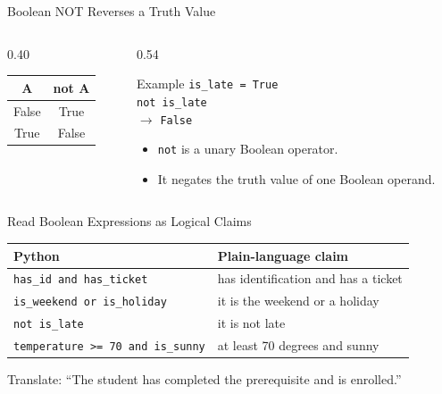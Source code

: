 \documentclass[aspectratio=169,10pt]{beamer}
\begin{document}
\begin{frame}{Boolean NOT Reverses a Truth Value}
  \begin{columns}[T,onlytextwidth]
    \begin{column}{0.40\textwidth}
      \begin{center}
        \renewcommand{\arraystretch}{1.35}
        \begin{tabular}{c|c}
          \textbf{A} & \textbf{not A} \\\hline
          False & True \\
          True & False
        \end{tabular}
      \end{center}
    \end{column}

    \begin{column}{0.54\textwidth}
      \begin{block}{Example}
        \texttt{is\_late = True}\\[0.08in]
        \texttt{not is\_late}\\[0.08in]
        $\longrightarrow$ \texttt{False}
      \end{block}

      \begin{itemize}
        \item \texttt{not} is a unary Boolean operator.
        \item It negates the truth value of one Boolean operand.
      \end{itemize}
    \end{column}
  \end{columns}
\end{frame}

\begin{frame}{Read Boolean Expressions as Logical Claims}
  \begin{center}
    \renewcommand{\arraystretch}{1.35}
    \begin{tabular}{l|l}
      \textbf{Python} & \textbf{Plain-language claim} \\\hline
      \texttt{has\_id and has\_ticket} & has identification and has a ticket \\
      \texttt{is\_weekend or is\_holiday} & it is the weekend or a holiday \\
      \texttt{not is\_late} & it is not late \\
      \texttt{temperature >= 70 and is\_sunny} & at least 70 degrees and sunny
    \end{tabular}
  \end{center}

  \begin{activity}
    Translate: ``The student has completed the prerequisite and is enrolled.''
  \end{activity}
\end{frame}
\end{document}
